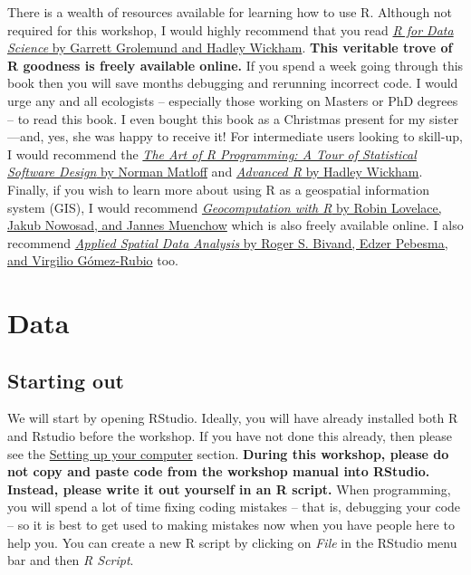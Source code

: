 \documentclass[12pt,]{book}
\begin{document}
There is a wealth of resources available for learning how to use R.
Although not required for this workshop, I would highly recommend that
you read \href{https://r4ds.had.co.nz/}{\emph{R for Data Science} by
Garrett Grolemund and Hadley Wickham}. \textbf{This veritable trove of R
goodness is freely available online.} If you spend a week going through
this book then you will save months debugging and rerunning incorrect
code. I would urge any and all ecologists -- especially those working on
Masters or PhD degrees -- to read this book. I even bought this book as
a Christmas present for my sister---and, yes, she was happy to receive
it! For intermediate users looking to skill-up, I would recommend the
\href{http://shop.oreilly.com/product/9781593273842.do}{\emph{The Art of
R Programming: A Tour of Statistical Software Design} by Norman Matloff}
and \href{https://adv-r.hadley.nz/}{\emph{Advanced R} by Hadley
Wickham}. Finally, if you wish to learn more about using R as a
geospatial information system (GIS), I would recommend
\href{https://geocompr.robinlovelace.net/}{\emph{Geocomputation with R}
by Robin Lovelace, Jakub Nowosad, and Jannes Muenchow} which is also
freely available online. I also recommend
\href{https://www.springer.com/gp/book/9781461476177}{\emph{Applied
Spatial Data Analysis} by Roger S. Bivand, Edzer Pebesma, and Virgilio
Gómez-Rubio} too.

\chapter{Data}\label{data}

\section{Starting out}\label{starting-out}

We will start by opening RStudio. Ideally, you will have already
installed both R and Rstudio before the workshop. If you have not done
this already, then please see the \protect\hyperlink{setup}{Setting up
your computer} section. \textbf{During this workshop, please do not copy
and paste code from the workshop manual into RStudio. Instead, please
write it out yourself in an R script.} When programming, you will spend
a lot of time fixing coding mistakes -- that is, debugging your code --
so it is best to get used to making mistakes now when you have people
here to help you. You can create a new R script by clicking on
\emph{File} in the RStudio menu bar and then \emph{R Script}.
\end{document}
